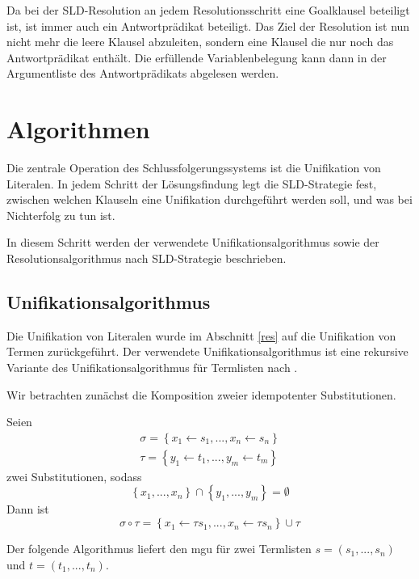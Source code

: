 Da bei der SLD-Resolution an jedem Resolutionsschritt eine Goalklausel beteiligt ist, ist immer auch ein Antwortprädikat beteiligt. Das Ziel der Resolution ist nun nicht mehr die leere Klausel abzuleiten, sondern eine Klausel die nur noch das Antwortprädikat enthält. Die erfüllende Variablenbelegung kann dann in der Argumentliste des Antwortprädikats abgelesen werden.

\section{Algorithmen}
Die zentrale Operation des Schlussfolgerungssystems ist die Unifikation von Literalen. In jedem Schritt der Lösungsfindung legt die SLD-Strategie fest, zwischen welchen Klauseln eine Unifikation durchgeführt werden soll, und was bei Nichterfolg zu tun ist.

In diesem Schritt werden der verwendete Unifikationsalgorithmus sowie der Resolutionsalgorithmus nach SLD-Strategie beschrieben.

\subsection{Unifikationsalgorithmus}\label{unialg}
Die Unifikation von Literalen wurde im Abschnitt \ref{res} auf die Unifikation von Termen zurückgeführt. Der verwendete Unifikationsalgorithmus ist eine rekursive Variante des Unifikationsalgorithmus für Termlisten nach \cite{Robinson}.

Wir betrachten zunächst die Komposition zweier idempotenter Substitutionen.

\begin{leftbar}
  \begin{definition}
    \newline
    Seien
    \begin{eqnarray}
      \sigma = \left \{ x_1 \leftarrow s_1,...,x_n \leftarrow s_n\right \} \\
      \tau = \left \{ y_1 \leftarrow t_1,...,y_m \leftarrow t_m \right \}
    \end{eqnarray}
    zwei Substitutionen, sodass
    \begin{equation}
      \left \{ x_1,...,x_n\right \} \cap \left \{ y_1,...,y_m\right \} = \emptyset
    \end{equation}
    Dann ist
    \begin{equation}
      \sigma \circ \tau = \left \{ x_1 \leftarrow \tau s_1,...,x_n \leftarrow \tau s_n \right \} \cup \tau
    \end{equation}
  \end{definition}
\end{leftbar}
\noindent
Der folgende Algorithmus liefert den mgu für zwei Termlisten $s = (s_1,...,s_n)$ und $t = (t_1,...,t_n)$.

